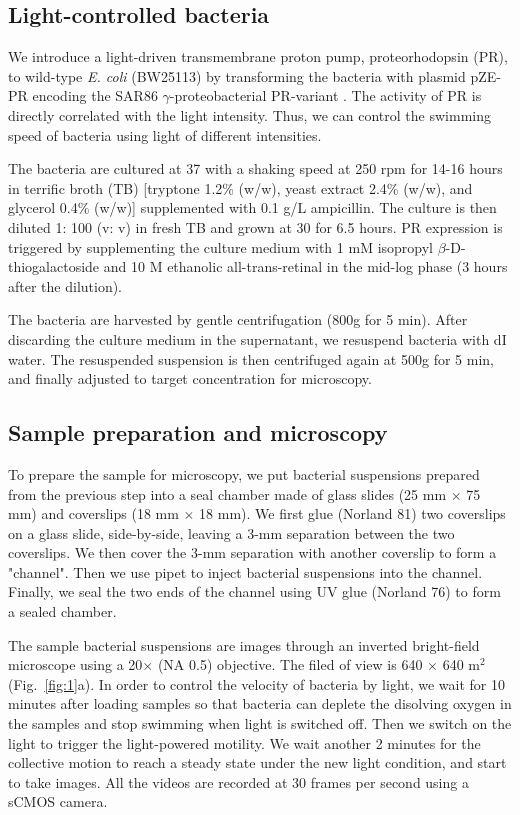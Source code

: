 \documentclass[twocolumn,aps,pre,amsmath,amssymb,longbibliography]{revtex4-1}
\begin{document}
\subsection{Light-controlled bacteria}
We introduce a light-driven transmembrane proton pump, proteorhodopsin (PR), to wild-type \textit{E. coli} (BW25113) by transforming the bacteria with plasmid pZE-PR encoding the SAR86 $\gamma$-proteobacterial PR-variant \cite{Walter2408}. The activity of PR is directly correlated with the light intensity. Thus, we can control the swimming speed of bacteria using light of different intensities.

The bacteria are cultured at 37 \textcelsius with a shaking speed at 250 rpm for 14-16 hours in terrific broth (TB) [tryptone 1.2\% (w/w), yeast extract 2.4\% (w/w), and glycerol 0.4\% (w/w)] supplemented with 0.1 g/L ampicillin. The culture is then diluted 1: 100 (v: v) in fresh TB and grown at 30 \textcelsius for 6.5 hours. PR expression is triggered by supplementing the culture medium with 1 mM isopropyl $\beta$-D-thiogalactoside and 10 \textmu M ethanolic all-trans-retinal in the mid-log phase (3 hours after the dilution).

The bacteria are harvested by gentle centrifugation (800g for 5 min). After discarding the culture medium in the supernatant, we resuspend bacteria with dI water. The resuspended suspension is then centrifuged again at 500g for 5 min, and finally adjusted to target concentration for microscopy.



\subsection{Sample preparation and microscopy}

To prepare the sample for microscopy, we put bacterial suspensions prepared from the previous step into a seal chamber made of glass slides (25 mm $\times$ 75 mm) and coverslips (18 mm $\times$ 18 mm). We first glue (Norland 81) two coverslips on a glass slide, side-by-side, leaving a 3-mm separation between the two coverslips. We then cover the 3-mm separation with another coverslip to form a "channel". Then we use pipet to inject bacterial suspensions into the channel. Finally, we seal the two ends of the channel using UV glue (Norland 76) to form a sealed chamber.

The sample bacterial suspensions are images through an inverted bright-field microscope using a 20$\times$ (NA 0.5) objective. The filed of view is 640 $\times$ 640 \textmu m$^2$ (Fig.~\ref{fig:1}a). In order to control the velocity of bacteria by light, we wait for 10 minutes after loading samples so that bacteria can deplete the disolving oxygen in the samples and stop swimming when light is switched off. Then we switch on the light to trigger the light-powered motility. We wait another 2 minutes for the collective motion to reach a steady state under the new light condition, and start to take images. All the videos are recorded at 30 frames per second using a sCMOS camera.
\end{document}
